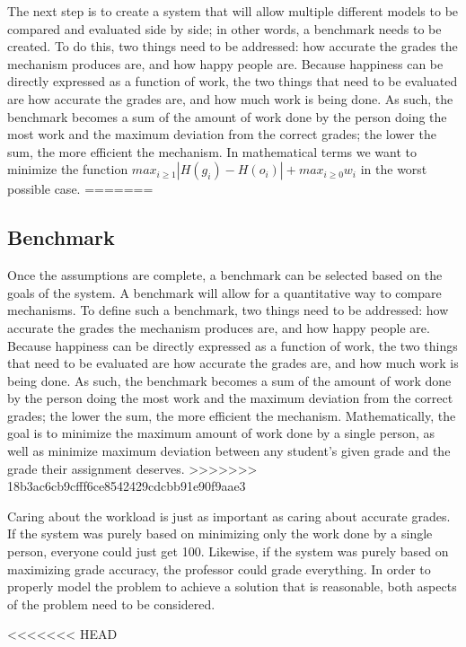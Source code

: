 \documentclass[12pt, Arial]{article}
\begin{document}
The next step is to create a system that will allow multiple different models to be compared and evaluated side by side; in other words, a benchmark needs to be created. To do this, two things need to be addressed: how accurate the grades the mechanism produces are, and how happy people are. Because happiness can be directly expressed as a function of work, the two things that need to be evaluated are how accurate the grades are, and how much work is being done. As such, the benchmark becomes a sum of the amount of work done by the person doing the most work and the maximum deviation from the correct grades; the lower the sum, the more efficient the mechanism. In mathematical terms we want to minimize the function $max_{i \ge 1} |H(g_i)-H(o_i)| + max_{i \ge 0} w_i$ in the worst possible case.
=======
\subsection{Benchmark}
Once the assumptions are complete, a benchmark can be selected based on the goals of the system. A benchmark will allow for a quantitative way to compare mechanisms. To define such a benchmark, two things need to be addressed: how accurate the grades the mechanism produces are, and how happy people are. Because happiness can be directly expressed as a function of work, the two things that need to be evaluated are how accurate the grades are, and how much work is being done. As such, the benchmark becomes a sum of the amount of work done by the person doing the most work and the maximum deviation from the correct grades; the lower the sum, the more efficient the mechanism. Mathematically, the goal is to minimize the maximum amount of work done by a single person, as well as minimize maximum deviation between any student's given grade and the grade their assignment deserves.
>>>>>>> 18b3ac6cb9cfff6ce8542429cdcbb91e90f9aae3

Caring about the workload is just as important as caring about accurate grades. If the system was purely based on minimizing only the work done by a single person, everyone could just get 100. Likewise, if the system was purely based on maximizing grade accuracy, the professor could grade everything. In order to properly model the problem to achieve a solution that is reasonable, both aspects of the problem need to be considered.

<<<<<<< HEAD
\end{document}
